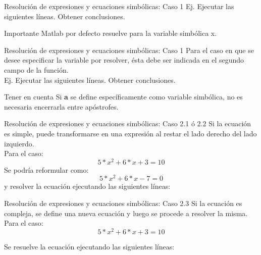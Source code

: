 \documentclass{bredelebeamer}
\begin{document}
\begin{frame}{Resolución de expresiones y ecuaciones simbólicas: Caso 1}
Ej. Ejecutar las siguientes líneas. Obtener conclusiones.
\begin{alertblock}{Importante}
Matlab por defecto resuelve para la variable simbólica x. 
\end{alertblock}
\end{frame}

\begin{frame}{Resolución de expresiones y ecuaciones simbólicas: Caso 1}
Para el caso en que se desee especificar la variable por resolver, ésta debe ser indicada en el segundo campo de la función.\\
Ej. Ejecutar las siguientes líneas. Obtener conclusiones.
\begin{block}{Tener en cuenta}
Si \textbf{a} se define específicamente como variable simbólica, no es necesaria encerrarla entre apóstrofes.
\end{block}
\end{frame}

\begin{frame}{Resolución de expresiones y ecuaciones simbólicas: Caso 2.1 ó 2.2}
Si la ecuación es simple, puede transformarse en una expresión al restar el lado derecho del lado izquierdo.\\
Para el caso:
\begin{equation*}
5*x^2+6*x+3=10
\end{equation*}
Se podría reformular como:
\begin{equation*}
5*x^2+6*x-7=0
\end{equation*}
y resolver la ecuación ejecutando las siguientes líneas:
\end{frame}

\begin{frame}{Resolución de expresiones y ecuaciones simbólicas: Caso 2.3}
Si la ecuación es compleja, se define una nueva ecuación y luego se procede a resolver la misma.
Para el caso:
\begin{equation*}
5*x^2+6*x+3=10
\end{equation*}

Se resuelve la ecuación ejecutando las siguientes líneas:
\end{frame}
\end{document}
